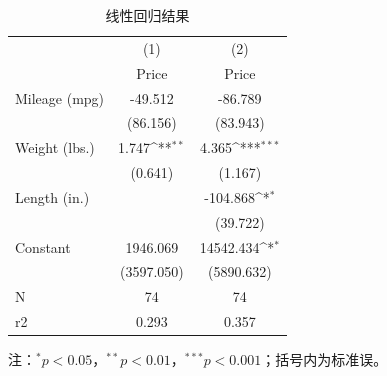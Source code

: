 \begin{table}[htbp]
  \centering
  \caption{ 线性回归结果 }
  \label{tab:reg}
  \small
    \def\sym#1{\ifmmode^{#1}\else\(^{#1}\)\fi}
  \begin{tabular}{l*{2}{c}}
    \toprule
                        &\multicolumn{1}{c}{(1)}&\multicolumn{1}{c}{(2)}\\
                        &\multicolumn{1}{c}{Price}&\multicolumn{1}{c}{Price}\\
    \midrule
    Mileage (mpg)       &     -49.512         &     -86.789         \\
                        &    (86.156)         &    (83.943)         \\
    \addlinespace
    Weight (lbs.)       &       1.747\sym{**} &       4.365\sym{***}\\
                        &     (0.641)         &     (1.167)         \\
    \addlinespace
    Length (in.)        &                     &    -104.868\sym{*}  \\
                        &                     &    (39.722)         \\
    \addlinespace
    Constant            &    1946.069         &   14542.434\sym{*}  \\
                        &  (3597.050)         &  (5890.632)         \\
    \midrule
    N                   &          74         &          74         \\
    r2                  &       0.293         &       0.357         \\
    \bottomrule
  \end{tabular}
\end{table}


注：$^{*}p<0.05$，$^{**}p<0.01$，$^{***}p<0.001$；括号内为标准误。
